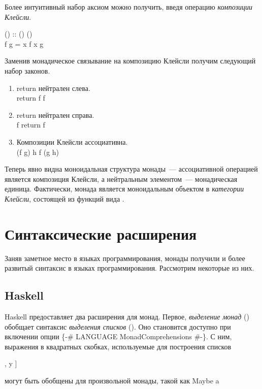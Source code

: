 Более интуитивный набор аксиом можно получить, введя операцию \emph{композиции Клейсли}.

\begin{haskell}
(\hskleisli) :: (\alpha \to \mu \beta) \to (\beta \to \mu \gamma) \to \alpha \to \mu \gamma \\
f \hskleisli g = \lambda x \to f x \hsbind g
\end{haskell}

Заменив монадическое связывание на композицию Клейсли получим следующий набор законов.
\begin{enumerate}
  \item \<return\> нейтрален слева. \\ \<return \hskleisli f \equiv f\>
  \item \<return\> нейтрален справа. \\ \<f \hskleisli return \equiv f\>
  \item Композиции Клейсли ассоциативна. \\ \<(f \hskleisli g) \hskleisli h \equiv f \hskleisli (g \hskleisli h)\>
\end{enumerate}

Теперь явно видна моноидальная структура монады~--- ассоциативной операцией является композиция Клейсли, а нейтральным элементом~--- монадическая единица. Фактически, монада является моноидальным объектом в \emph{категории Клейсли}, состоящей из функций вида \<\alpha \to \mu \beta\>.

\section{Синтаксические расширения}
Заняв заметное место в языках программирования, монады получили и более развитый синтаксис в языках программирования. Рассмотрим некоторые из них.

\subsection{Haskell}
Haskell предоставляет два расширения для монад. Первое, \emph{выделение монад}\cite{Wadler1994} () обобщает синтаксис \emph{выделения списков} (). Оно становится доступно при включении опции \<\{-\# LANGUAGE MonadComprehensions \#-\}\>. С ним, выражения в квадратных скобках, используемые для построения списков
\begin{haskell}
[ x + y | x \hsfrom [1, 2, 3], y \hsfrom [4, 5, 6] ]
\end{haskell}
\hspace{0cm}могут быть обобщены для произвольной монады, такой как \<Maybe a\>
\begin{haskell}
\end{haskell}

